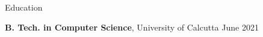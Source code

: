 \documentclass{resume} %
\begin{document}

   




\begin{rSection}{Education}

{\bf B. Tech. in Computer Science}, University of Calcutta \hfill {June 2021}

\end{rSection}
\end{document}
